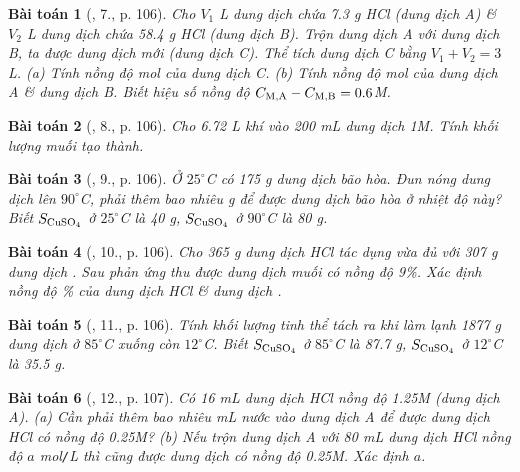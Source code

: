 \documentclass{article}
\newtheorem{baitoan}{Bài toán}
\begin{document}
\begin{baitoan}[\cite{An_Hoa_Hoc_nang_cao_8_9}, 7., p. 106]
	Cho $V_1$ {\rm L} dung dịch chứa {\rm7.3 g HCl} (dung dịch A) \& $V_2$ {\rm L} dung dịch chứa {\rm58.4 g HCl} (dung dịch B). Trộn dung dịch A với dung dịch B, ta được dung dịch mới (dung dịch C). Thể tích dung dịch C bằng $V_1 + V_2 = 3$ {\rm L}. (a) Tính nồng độ mol của dung dịch C. (b) Tính nồng độ mol của dung dịch A \& dung dịch B. Biết hiệu số nồng độ $C_{\rm M,A} - C_{\rm M,B} = 0.6${\rm M}.
\end{baitoan}

\begin{baitoan}[\cite{An_Hoa_Hoc_nang_cao_8_9}, 8., p. 106]
	Cho {\rm6.72 L} khí {\rm{}} vào {\rm200 mL} dung dịch {\rm{} 1M}. Tính khối lượng muối tạo thành.
\end{baitoan}

\begin{baitoan}[\cite{An_Hoa_Hoc_nang_cao_8_9}, 9., p. 106]
	Ở $25^\circ${\rm C} có {\rm175 g} dung dịch {\rm{}} bão hòa. Đun nóng dung dịch lên $90^\circ${\rm C}, phải thêm bao nhiêu {\rm g } để được dung dịch bão hòa ở nhiệt độ này? Biết $S_{\ce{CuSO4}}$ ở $25^\circ${\rm C} là {\rm40 g}, $S_{\ce{CuSO4}}$ ở $90^\circ${\rm C} là {\rm80 g}.
\end{baitoan}

\begin{baitoan}[\cite{An_Hoa_Hoc_nang_cao_8_9}, 10., p. 106]
	Cho {\rm365 g} dung dịch {\rm HCl} tác dụng vừa đủ với {\rm307 g} dung dịch {\rm{}}. Sau phản ứng thu được dung dịch muối có nồng độ {\rm9\%}. Xác định nồng độ {\rm\%} của dung dịch {\rm HCl} \& dung dịch {\rm{}}.
\end{baitoan}

\begin{baitoan}[\cite{An_Hoa_Hoc_nang_cao_8_9}, 11., p. 106]
	Tính khối lượng tinh thể {\rm{}} tách ra khi làm lạnh {\rm1877 g} dung dịch {\rm{}} ở $85^\circ${\rm C} xuống còn $12^\circ${\rm C}. Biết $S_{\ce{CuSO4}}$ ở $85^\circ${\rm C} là {\rm87.7 g}, $S_{\ce{CuSO4}}$ ở $12^\circ${\rm C} là {\rm35.5 g}.
\end{baitoan}

\begin{baitoan}[\cite{An_Hoa_Hoc_nang_cao_8_9}, 12., p. 107]
	Có {\rm16 mL} dung dịch {\rm HCl} nồng độ {\rm1.25M} (dung dịch A). (a) Cần phải thêm bao nhiêu {\rm mL} nước vào dung dịch A để được dung dịch {\rm HCl} có nồng độ {\rm0.25M}? (b) Nếu trộn dung dịch A với {\rm80 mL} dung dịch {\rm HCl} nồng độ $a$ {\rm mol{\tt/}L} thì cũng được dung dịch có nồng độ {\rm0.25M}. Xác định $a$.
\end{baitoan}
\end{document}
